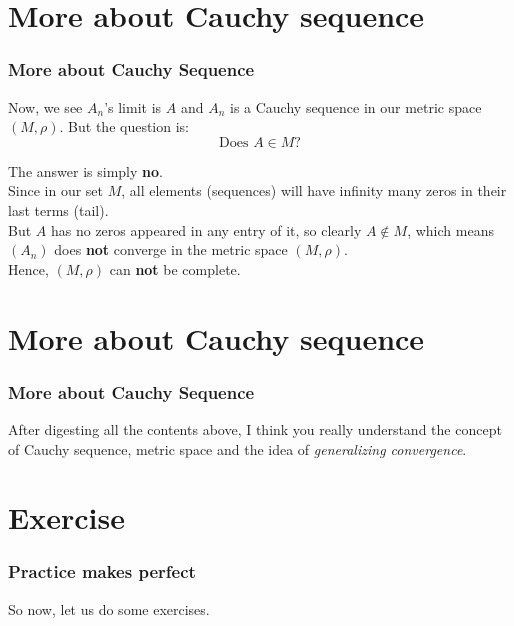 \documentclass[12pt, t]{beamer}
\renewcommand{\emph}[1]{{\color{Turquoise3}\textsl{#1}}}
\begin{document}
\section{More about Cauchy sequence}
\begin{frame}
    \frametitle{More about Cauchy Sequence}
Now, we see $A_n$'s limit is $A$ and $A_n$ is a Cauchy sequence in our metric space $(M,\rho)$. But the question is: 
\begin{equation*}
    \text{Does } A\in M \text{?}
\end{equation*}

The answer is simply \textbf{no}.\\
\vspace{1em} Since in our set $M$, all elements (sequences) will have infinity many zeros in their last terms (tail).\\

\vspace{1em} But $A$ has no zeros appeared in any entry of it, so clearly $A\notin M$, which means $(A_n)$ does \textbf{not} converge in the metric space
$(M,\rho)$.\\

\vspace{1em} Hence, $(M,\rho)$ can \textbf{not} be complete.
\end{frame}

\section{More about Cauchy sequence}
\begin{frame}
    \frametitle{More about Cauchy Sequence}
    After digesting all the contents above, I think you really understand the concept of Cauchy sequence, metric space and the idea of 
\emph{generalizing convergence}.\\
\vspace{1em}

\end{frame}

\section{Exercise}
\begin{frame}
    \frametitle{Practice makes perfect}
\vspace{7em}
\begin{center}
    
    \Large So now, let us do some exercises.
\end{center}
\end{frame}
\end{document}
